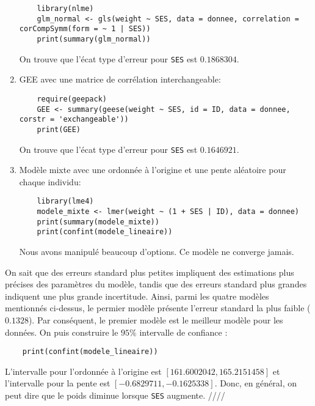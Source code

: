 \documentclass[../main.tex]{subfiles}
\begin{document}
\begin{CJK*}{UTF8}{gbsn}
\begin{enumerate}
\begin{lstlisting}
    library(nlme)
    glm_normal <- gls(weight ~ SES, data = donnee, correlation = corCompSymm(form = ~ 1 | SES))
    print(summary(glm_normal)) 
\end{lstlisting}

On trouve que l'écat type d'erreur pour \texttt{SES} est $0.1868304$.
    \item GEE avec une matrice de corrélation interchangeable:
    
\begin{lstlisting}
    require(geepack)
    GEE <- summary(geese(weight ~ SES, id = ID, data = donnee, corstr = 'exchangeable'))
    print(GEE) 
\end{lstlisting}
On trouve que l'écat type d'erreur pour \texttt{SES} est $0.1646921$.

    \item Modèle mixte avec une ordonnée à l'origine et une pente aléatoire pour chaque individu:
\begin{lstlisting}
    library(lme4)
    modele_mixte <- lmer(weight ~ (1 + SES | ID), data = donnee)
    print(summary(modele_mixte)) 
    print(confint(modele_lineaire))
\end{lstlisting}
Nous avons manipulé beaucoup d'options. Ce modèle ne converge jamais. 
\end{enumerate}

On sait que des erreurs standard plus petites impliquent 
des estimations plus précises des paramètres du modèle, 
tandis que des erreurs standard plus grandes indiquent une plus grande incertitude. 
Ainsi, parmi les quatre modèles mentionnés ci-dessus, 
le permier modèle présente l'erreur standard la plus faible ($0.1328$).
Par conséquent, le premier modèle est le meilleur modèle pour les données.
On puis construire le $95 \%$ intervalle de confiance :

\begin{lstlisting}
    print(confint(modele_lineaire))
\end{lstlisting}

L'intervalle pour l'ordonnée à l'origine est $[161.6002042, 165.2151458]$
et l'intervalle pour la pente est $[-0.6829711, -0.1625338]$.
Donc, en général, on peut dire que le poids diminue lorsque \texttt{SES} augmente. ////

\end{CJK*}
\end{document}
